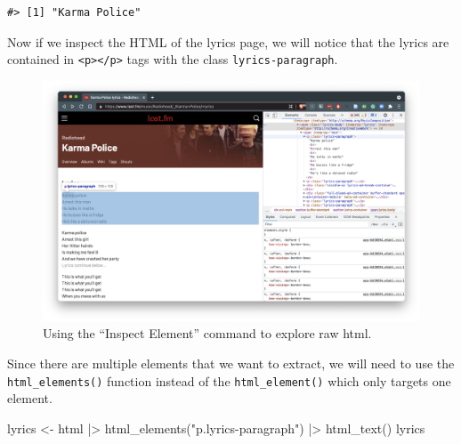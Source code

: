 \documentclass[
  letterpaper,
]{scrbook}
\newenvironment{Shaded}{\begin{snugshade}}{\end{snugshade}}
\newcommand{\FunctionTok}[1]{\textcolor[rgb]{0.00,0.00,0.00}{#1}}
\newcommand{\NormalTok}[1]{\textcolor[rgb]{0.00,0.00,0.00}{#1}}
\newcommand{\OtherTok}[1]{\textcolor[rgb]{0.00,0.00,0.00}{#1}}
\newcommand{\SpecialCharTok}[1]{\textcolor[rgb]{0.00,0.00,0.00}{#1}}
\newcommand{\StringTok}[1]{\textcolor[rgb]{0.00,0.00,0.00}{#1}}
\begin{document}
\begin{verbatim}
#> [1] "Karma Police"
\end{verbatim}

Now if we inspect the HTML of the lyrics page, we will notice that the
lyrics are contained in
\texttt{\textless{}p\textgreater{}\textless{}/p\textgreater{}} tags with
the class \texttt{lyrics-paragraph}.

\begin{figure}[h]

{\centering \includegraphics[width=9.28in,height=\textheight]{./figures/acquire-data/ad-lastfm-lyrics-inspect.png}

}

\caption{\label{fig-ad-inspect-element-lyrics-lastfm}Using the ``Inspect
Element'' command to explore raw html.}

\end{figure}

Since there are multiple elements that we want to extract, we will need
to use the \texttt{html\_elements()} function instead of the
\texttt{html\_element()} which only targets one element.

\begin{Shaded}
\begin{Highlighting}[]
\NormalTok{lyrics }\OtherTok{\textless{}{-}} 
\NormalTok{  html }\SpecialCharTok{|\textgreater{}} 
  \FunctionTok{html\_elements}\NormalTok{(}\StringTok{"p.lyrics{-}paragraph"}\NormalTok{) }\SpecialCharTok{|\textgreater{}} 
  \FunctionTok{html\_text}\NormalTok{()}
\NormalTok{lyrics}
\end{Highlighting}
\end{Shaded}
\end{document}
